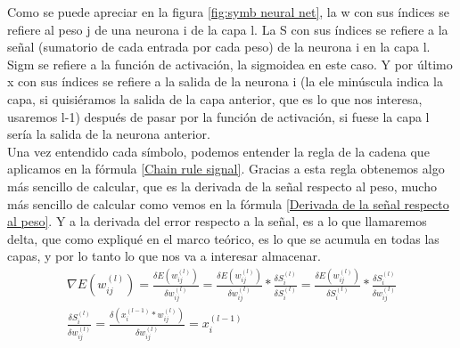 Como se puede apreciar en la figura \ref{fig:symb neural net}, la w con sus índices se refiere al peso j de una neurona i de la capa l. La S  con sus índices se refiere a la señal (sumatorio de cada entrada por cada peso) de la neurona i en la capa l. Sigm se refiere a la función de activación, la sigmoidea en este caso. Y por último x con sus índices se refiere a la salida de la neurona i (la ele minúscula indica la capa, si quisiéramos la salida de la capa anterior, que es lo que nos interesa, usaremos l-1) después de pasar por la función de activación, si fuese la capa l sería la salida de la neurona anterior.
\\
Una vez entendido cada símbolo, podemos entender la regla de la cadena que aplicamos en la fórmula \ref{Chain rule signal}. Gracias a esta regla obtenemos algo más sencillo de calcular, que es la derivada de la señal respecto al peso, mucho más sencillo de calcular como vemos en la fórmula \ref{Derivada de la señal respecto al peso}. Y a la derivada del error respecto a la señal, es a lo que llamaremos delta, que como expliqué en el marco teórico, es lo que se acumula en todas las capas, y por lo tanto lo que nos va a interesar almacenar.
\begin{subequations}
	\begin{eqnarray}
		\nabla E(w_{ij}^{(l)}) =  \frac{\delta E(w_{ij}^{(l)})}{\delta w_{ij}^{(l)}} = \frac{\delta E(w_{ij}^{(l)})}{\delta w_{ij}^{(l)}} * \frac{\delta S_{i}^{(l)}}{\delta S_{i}^{(l)}} = \frac{\delta E(w_{ij}^{(l)})}{\delta S_{i}^{(l)}} * \frac{\delta S_{i}^{(l)}}{\delta w_{ij}^{(l)}} \label{Chain rule signal} \\
		\frac{\delta S_{i}^{(l)}}{\delta w_{ij}^{(l)}} = \frac{\delta (x_{i}^{(l-1)}*w_{ij}^{(l)}) }{\delta w_{ij}^{(l)}} = x_{i}^{(l-1)} \label{Derivada de la señal respecto al peso}
	\end{eqnarray}
\end{subequations}

